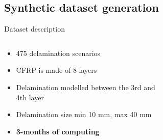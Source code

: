 \documentclass[10pt,aspectratio=169,dvipsnames]{beamer} %
\begin{document}
	\subsection{Synthetic dataset generation}
	
	\setcounter{subfigure}{0}
	\begin{frame}{Dataset description}
		\begin{columns}[T]
			\begin{column}[t]{0.35\textwidth}
					\begin{itemize}
						\item 475 delamination scenarios
						\item CFRP is made of 8-layers
						\item Delamination modelled between the 3rd and 4th layer
						\item Delamination size min 10 mm, max  40 mm
						\item \textbf{3-months of computing}
					\end{itemize}
			\end{column}
			\begin{column}[t]{0.2\textwidth}
				\begin{figure}[t]
					\centering
				\end{figure}
			\end{column}
			\begin{column}[t]{0.45\textwidth}
					\begin{figure}[t]					
						\centering						

\end{figure}
\end{column}
\end{columns}
\end{frame}
\end{document}
